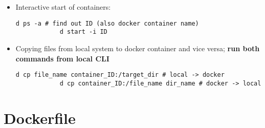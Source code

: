 \documentclass[12pt, a4paper]{scrbook}
\numberwithin{equation}{section}
\theoremstyle{definition}
\theoremstyle{definition}
\begin{document}
	\begin{itemize} 
		\item Interactive start of containers: 
		
		\begin{lstlisting}[style=mystylebash, label=alg:docker_id, xleftmargin=\parindent]
			d ps -a # find out ID (also docker container name)
			d start -i ID
		\end{lstlisting}
		
		\item Copying files from local system to docker container and vice versa; \textbf{run both commands from local CLI}
		
		\begin{lstlisting}[style=mystylebash, label=alg:docker_cp, xleftmargin=\parindent]
			d cp file_name container_ID:/target_dir # local -> docker
			d cp container_ID:/file_name dir_name # docker -> local
		\end{lstlisting}
		
	\end{itemize}
	
	\section{Dockerfile}
	
\end{document}
